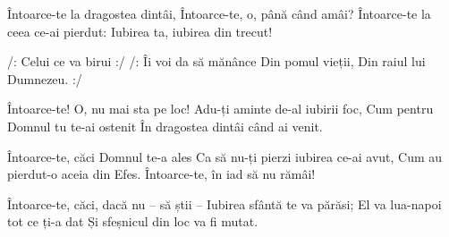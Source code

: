\beginverse
Întoarce-te la dragostea dintâi,
Întoarce-te, o, până când amâi?
Întoarce-te la ceea ce-ai pierdut:
Iubirea ta, iubirea din trecut!
\endverse

\beginchorus
/: Celui ce va birui :/
/: Îi voi da să mănânce
Din pomul vieții,
Din raiul lui Dumnezeu. :/
\endchorus

\beginverse
Întoarce-te! O, nu mai sta pe loc!
Adu-ți aminte de-al iubirii foc,
Cum pentru Domnul tu te-ai ostenit
În dragostea dintâi când ai venit.
\endverse

\beginverse
Întoarce-te, căci Domnul te-a ales
Ca să nu-ți pierzi iubirea ce-ai avut,
Cum au pierdut-o aceia din Efes.
Întoarce-te, în iad să nu rămâi!
\endverse

\beginverse
Întoarce-te, căci, dacă nu – să știi –
Iubirea sfântă te va părăsi;
El va lua-napoi tot ce ți-a dat
Și sfeșnicul din loc va fi mutat.
\endverse
\endsong